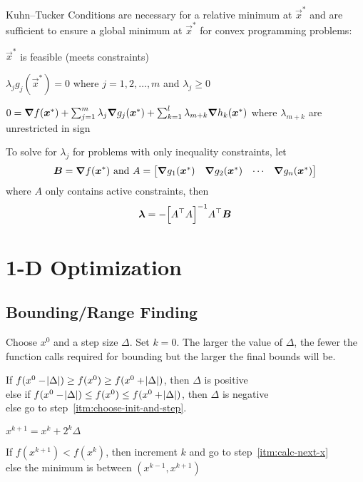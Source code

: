\documentclass{article}
\begin{document}
Kuhn--Tucker Conditions are necessary for a relative minimum at \(\vec{x}^*\) and are sufficient to
ensure a global minimum at \(\vec{x}^*\) for convex programming problems:
\begin{enumerate*}
  \item \(\vec{x}^*\) is feasible (meets constraints)
  \item \(\lambda_j g_j(\vec{x}^*) = 0\) where \(j = 1, 2, \dots, m\) and \(\lambda_j \ge 0\)
  \item \(0 = \bm{\nabla} f(\bm{x}^*) + \sum_{j=1}^m{\lambda_j \bm{\nabla} g_j(\bm{x}^*)} +
    \sum_{k=1}^l{\lambda_{m+k} \bm{\nabla} h_k(\bm{x}^*)}\)
    where \(\lambda_{m+k}\) are unrestricted in sign
\end{enumerate*}
To solve for \(\lambda_j\) for problems with only inequality constraints, let
\[\bm{B} = \bm{\nabla} f(\bm{x}^*) \textrm{ and } A =
\begin{bmatrix}
  \bm{\nabla} g_1(\bm{x}^*) & \bm{\nabla} g_2(\bm{x}^*) & \cdots & \bm{\nabla} g_n(\bm{x}^*)
\end{bmatrix}\]
where \(A\) only contains active constraints, then
\[\bm{\lambda} = -{\left[{{A}^\top} A\right]}^{-1} {{A}^\top} \bm{B}\]

\section{1-D Optimization}\label{sec:1-d-optimization}

\subsection{Bounding\slash{}Range Finding}\label{sec:bounding}

\begin{enumerate*}
\item \label{itm:choose-init-and-step} Choose \(x^0\) and a step size \(\Delta\). Set \(k = 0\). The
  larger the value of \(\Delta\), the fewer the function calls required for bounding but the larger
  the final bounds will be.
\item If \(f(x^0 - \abs{\Delta}) \ge f(x^0) \ge f(x^0 + \abs{\Delta})\),
  then \(\Delta\) is positive \\
  else if \(f(x^0 - \abs{\Delta}) \le f(x^0) \le f(x^0 + \abs{\Delta})\),
  then \(\Delta\) is negative \\
  else go to step~\ref{itm:choose-init-and-step}.
\item \label{itm:calc-next-x} \(x^{k+1} = x^k + 2^k \Delta\)
\item If \(f(x^{k+1}) < f(x^k)\),
  then increment \(k\) and go to step~\ref{itm:calc-next-x} \\
  else the minimum is between \((x^{k-1}, x^{k+1})\)
\end{enumerate*}
\end{document}
